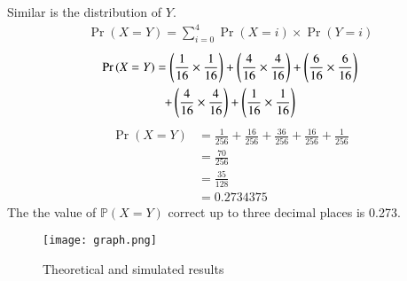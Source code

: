 \documentclass[journal,12pt,twocolumn]{IEEEtran}
\begin{document}
Similar is the distribution of $Y$.
\begin{align}
    \Pr{(X=Y)} = \sum_{i=0}^4 \Pr{(X=i)} \times \Pr{(Y=i)}
\end{align}
\begin{multline}
    \Pr{(X=Y)} = \left(\frac{1}{16}\times\frac{1}{16}\right) + \left(\frac{4}{16}\times\frac{4}{16}\right) +\left(\frac{6}{16}\times\frac{6}{16}\right) \\+\left(\frac{4}{16}\times\frac{4}{16}\right) +\left(\frac{1}{16}\times\frac{1}{16}\right) 
\end{multline}
\begin{align}
    \Pr{(X=Y)} &= \frac{1}{256} + \frac{16}{256} +\frac{36}{256} +\frac{16}{256} +\frac{1}{256} 
    \\&= \frac{70}{256} 
    \\&= \frac{35}{128} 
    \\&= 0.2734375
\end{align}
The the value of $\mathbb{P}(X=Y)$ correct up to three decimal places is 0.273.
\begin{figure} [H]
    \texttt{[image: graph.png]}
    \caption{Theoretical and simulated results}
    \label{Fig 1}
\end{figure}
\end{document}
